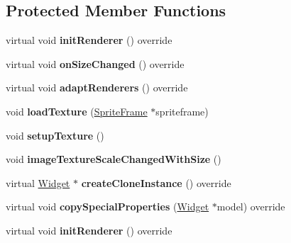\subsection*{Protected Member Functions}
\begin{DoxyCompactItemize}
\item 
\mbox{\label{classui_1_1ImageView_abe3d8a65322e875058b34ff6fecd8aa2}} 
virtual void {\bfseries init\+Renderer} () override
\item 
\mbox{\label{classui_1_1ImageView_aedca54387309cdf23181340b71042dd0}} 
virtual void {\bfseries on\+Size\+Changed} () override
\item 
\mbox{\label{classui_1_1ImageView_a464d2afc0047bcc7f337858f9680b4c4}} 
virtual void {\bfseries adapt\+Renderers} () override
\item 
\mbox{\label{classui_1_1ImageView_a55baa8a2f58014c525906e189147400e}} 
void {\bfseries load\+Texture} (\hyperlink{classSpriteFrame}{Sprite\+Frame} $\ast$spriteframe)
\item 
\mbox{\label{classui_1_1ImageView_ab7ee92cccf046d2cc0a23aaeaef3751d}} 
void {\bfseries setup\+Texture} ()
\item 
\mbox{\label{classui_1_1ImageView_a7e1258bb212cd3b565f43571951fe3cd}} 
void {\bfseries image\+Texture\+Scale\+Changed\+With\+Size} ()
\item 
\mbox{\label{classui_1_1ImageView_a20831b1787c567f5823f437fcbf9bcb3}} 
virtual \hyperlink{classui_1_1Widget}{Widget} $\ast$ {\bfseries create\+Clone\+Instance} () override
\item 
\mbox{\label{classui_1_1ImageView_a4dc02f188c3b89f367f37b5f93f858a8}} 
virtual void {\bfseries copy\+Special\+Properties} (\hyperlink{classui_1_1Widget}{Widget} $\ast$model) override
\item 
\mbox{\label{classui_1_1ImageView_ac44e9e4e93144bd19ada41ffa9e2b555}} 
virtual void {\bfseries init\+Renderer} () override
\item 

\end{DoxyCompactItemize}
